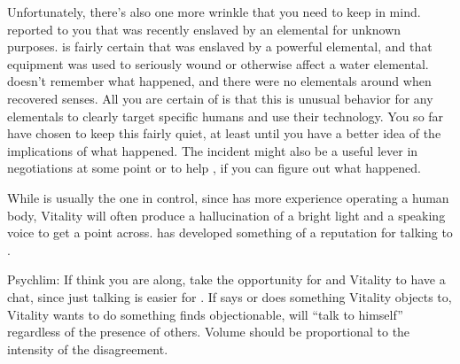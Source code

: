 \documentclass[char]{elementals}
\begin{document}
Unfortunately, there's also one more wrinkle that you need to keep in mind.  \cGD{} reported to you that \cGD{\they} was recently enslaved by an elemental for unknown purposes.  \cGD{\They} is fairly certain that \cGD{\they} was enslaved by a powerful elemental, and that \cGD{\their} equipment was used to seriously wound or otherwise affect a water elemental.  \cGD{} doesn't remember what happened, and there were no elementals around when \cGD{\they} recovered \cGD{\their} senses.  All you are certain of is that this is unusual behavior for any elementals to clearly target specific humans and use their technology.  You so far have chosen to keep this fairly quiet, at least until you have a better idea of the implications of what happened.  The incident might also be a useful lever in negotiations at some point or to help \cGD{}, if you can figure out what happened.

While \cAvatar{} is usually the one in control, since \cAvatar{\they} has more experience operating a human body, Vitality will often produce a hallucination of a bright light and a speaking voice to get a point across.  \cAvatar{} has developed something of a reputation for talking to \cAvatar{\themself}.



Psychlim:  If think you are along, take the opportunity for \cAvatar{} and Vitality to have a chat, since just talking is easier for \cAvatar{}.  If \cAvatar{} says or does something Vitality objects to, Vitality wants \cAvatar{} to do something \cAvatar{\they} finds objectionable, \cAvatar{} will ``talk to himself'' regardless of the presence of others.  Volume should be proportional to the intensity of the disagreement.
\end{document}
